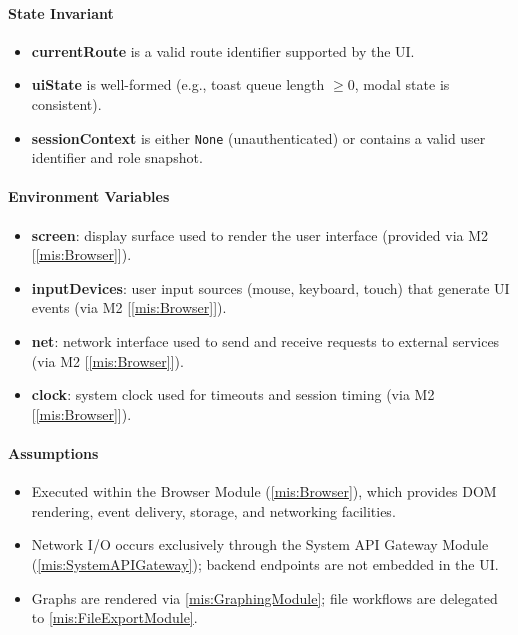\documentclass[12pt, titlepage]{article}
\begin{document}
  \paragraph{State Invariant}
  \begin{itemize}
    \item \textbf{currentRoute} is a valid route identifier supported by the UI.
    \item \textbf{uiState} is well-formed (e.g., toast queue length $\geq 0$, modal state is consistent).
    \item \textbf{sessionContext} is either \texttt{None} (unauthenticated) or contains a valid user identifier and role snapshot.
  \end{itemize}

  \paragraph{Environment Variables}
  \begin{itemize}
    \item \textbf{screen}: display surface used to render the user interface (provided via M2 [\ref{mis:Browser}]).
    \item \textbf{inputDevices}: user input sources (mouse, keyboard, touch) that generate UI events (via M2 [\ref{mis:Browser}]).
    \item \textbf{net}: network interface used to send and receive requests to external services (via M2 [\ref{mis:Browser}]).
    \item \textbf{clock}: system clock used for timeouts and session timing (via M2 [\ref{mis:Browser}]).
  \end{itemize}


  \paragraph{Assumptions}
  \begin{itemize}
    \item Executed within the Browser Module (\ref{mis:Browser}), which provides DOM rendering, event delivery, storage, and networking facilities.
    \item Network I/O occurs exclusively through the System API Gateway Module (\ref{mis:SystemAPIGateway}); backend endpoints are not embedded in the UI.
    \item Graphs are rendered via \ref{mis:GraphingModule}; file workflows are delegated to \ref{mis:FileExportModule}.
  \end{itemize}
\end{document}
